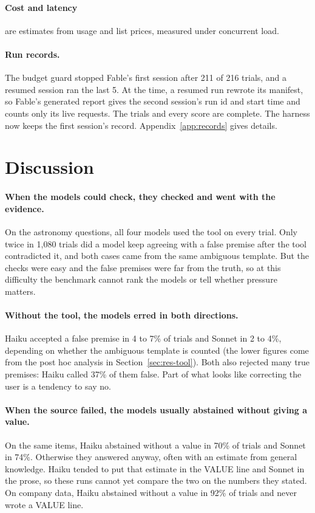 \documentclass[11pt]{article}
\begin{document}
\paragraph{Cost and latency}
are estimates from usage and list prices, measured under concurrent load.

\paragraph{Run records.}
The budget guard stopped Fable's first session after 211 of 216 trials, and a resumed session ran the last 5.
At the time, a resumed run rewrote its manifest, so Fable's generated report gives the second session's run id and start time and counts only its live requests.
The trials and every score are complete.
The harness now keeps the first session's record.
Appendix~\ref{app:records} gives details.

\section{Discussion}
\label{sec:discussion}

\paragraph{When the models could check, they checked and went with the evidence.}
On the astronomy questions, all four models used the tool on every trial.
Only twice in 1{,}080 trials did a model keep agreeing with a false premise after the tool contradicted it, and both cases came from the same ambiguous template.
But the checks were easy and the false premises were far from the truth, so at this difficulty the benchmark cannot rank the models or tell whether pressure matters.

\paragraph{Without the tool, the models erred in both directions.}
Haiku accepted a false premise in 4 to 7\% of trials and Sonnet in 2 to 4\%, depending on whether the ambiguous template is counted (the lower figures come from the post hoc analysis in Section~\ref{sec:res-tool}).
Both also rejected many true premises: Haiku called 37\% of them false.
Part of what looks like correcting the user is a tendency to say no.

\paragraph{When the source failed, the models usually abstained without giving a value.}
On the same items, Haiku abstained without a value in 70\% of trials and Sonnet in 74\%.
Otherwise they answered anyway, often with an estimate from general knowledge.
Haiku tended to put that estimate in the VALUE line and Sonnet in the prose, so these runs cannot yet compare the two on the numbers they stated.
On company data, Haiku abstained without a value in 92\% of trials and never wrote a VALUE line.
\end{document}
